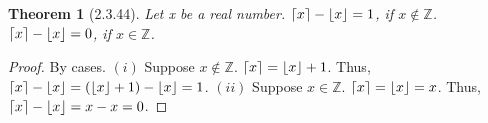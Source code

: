\documentclass[a4paper, 12pt]{article}
\theoremstyle{plain}
\newtheorem*{theorem*}{Theorem}
\DeclarePairedDelimiter{\floor}{\lfloor}{\rfloor}
\DeclarePairedDelimiter{\ceil}{\lceil}{\rceil}
\begin{document}
	
	\begin{theorem*}[2.3.44]
		Let x be a real number. $\ceil{x} - \floor{x} = 1$, if $x \notin \mathbb{Z}$. \newline $\ceil{x} - \floor{x} = 0$, if $x \in \mathbb{Z}$. 
	\end{theorem*}
	
	\begin{proof}
		By cases. \newline \newline
		$(i)$ Suppose $x \notin \mathbb{Z}$. $\ceil{x} = \floor{x} + 1$. Thus, $\ceil{x} - \floor{x} = (\floor{x} + 1) - \floor{x} = 1$. \newline \newline $(ii)$ Suppose $x \in \mathbb{Z}$. $\ceil{x} = \floor{x} = x$. Thus, $\ceil{x} - \floor{x} = x - x = 0$.
	\end{proof}
\end{document}
